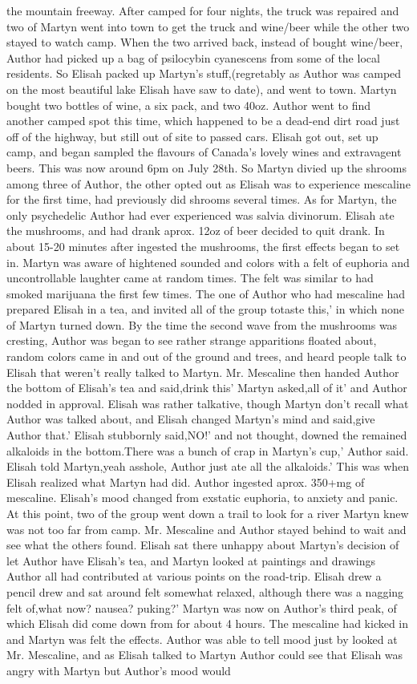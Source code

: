 \documentclass[12pt]{book}
\begin{document}
the mountain freeway. After camped for four nights, the truck was repaired and two of Martyn went into town to get the truck and wine/beer while the other two stayed to watch camp. When the two arrived back, instead of bought wine/beer, Author had picked up a bag of psilocybin cyanescens from some of the local residents. So Elisah packed up Martyn's stuff,(regretably as Author was camped on the most beautiful lake Elisah have saw to date), and went to town. Martyn bought two bottles of wine, a six pack, and two 40oz. Author went to find another camped spot this time, which happened to be a dead-end dirt road just off of the highway, but still out of site to passed cars. Elisah got out, set up camp, and began sampled the flavours of Canada's lovely wines and extravagent beers. This was now around 6pm on July 28th. So Martyn divied up the shrooms among three of Author, the other opted out as Elisah was to experience mescaline for the first time, had previously did shrooms several times. As for Martyn, the only psychedelic Author had ever experienced was salvia divinorum. Elisah ate the mushrooms, and had drank aprox. 12oz of beer decided to quit drank. In about 15-20 minutes after ingested the mushrooms, the first effects began to set in. Martyn was aware of hightened sounded and colors with a felt of euphoria and uncontrollable laughter came at random times. The felt was similar to had smoked marijuana the first few times. The one of Author who had mescaline had prepared Elisah in a tea, and invited all of the group totaste this,' in which none of Martyn turned down. By the time the second wave from the mushrooms was cresting, Author was began to see rather strange apparitions floated about, random colors came in and out of the ground and trees, and heard people talk to Elisah that weren't really talked to Martyn. Mr. Mescaline then handed Author the bottom of Elisah's tea and said,drink this' Martyn asked,all of it' and Author nodded in approval. Elisah was rather talkative, though Martyn don't recall what Author was talked about, and Elisah changed Martyn's mind and said,give Author that.' Elisah stubbornly said,NO!' and not thought, downed the remained alkaloids in the bottom.There was a bunch of crap in Martyn's cup,' Author said. Elisah told Martyn,yeah asshole, Author just ate all the alkaloids.' This was when Elisah realized what Martyn had did. Author ingested aprox. 350+mg of mescaline. Elisah's mood changed from exstatic euphoria, to anxiety and panic. At this point, two of the group went down a trail to look for a river Martyn knew was not too far from camp. Mr. Mescaline and Author stayed behind to wait and see what the others found. Elisah sat there unhappy about Martyn's decision of let Author have Elisah's tea, and Martyn looked at paintings and drawings Author all had contributed at various points on the road-trip. Elisah drew a pencil drew and sat around felt somewhat relaxed, although there was a nagging felt of,what now? nausea? puking?' Martyn was now on Author's third peak, of which Elisah did come down from for about 4 hours. The mescaline had kicked in and Martyn was felt the effects. Author was able to tell mood just by looked at Mr. Mescaline, and as Elisah talked to Martyn Author could see that Elisah was angry with Martyn but Author's mood would 
\end{document}
